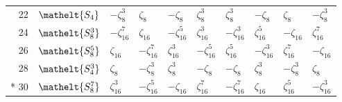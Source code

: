 \documentclass[10pt,a4paper]{article}
\numberwithin{equation}{section}
\newcommand{\eltfont}[1]{{\let\sigma\eltsigma\mathelt{#1}}}
\newcommand{\cls}[1]{\eltfont{#1}}
\newcommand{\rootunity}[1]{\zeta_{#1}}
\begin{document}
{\begin{longtable}{@{}rlllllllll@{}}
22 & $\cls{S_{4}}$ & $-\rootunity{8}^{3}$ & $\rootunity{8}$ & $-\rootunity{8}$ & $\rootunity{8}^{3}$ & $\rootunity{8}^{3}$ & $-\rootunity{8}$ & $\rootunity{8}$ & $-\rootunity{8}^{3}$\\
24 & $\cls{S_{8}^{3}}$ & $-\rootunity{16}^{7}$ & $\rootunity{16}$ & $-\rootunity{16}^{5}$ & $\rootunity{16}^{3}$ & $-\rootunity{16}^{3}$ & $\rootunity{16}^{5}$ & $-\rootunity{16}$ & $\rootunity{16}^{7}$\\
26 & $\cls{S_{8}^{5}}$ & $\rootunity{16}$ & $-\rootunity{16}^{7}$ & $\rootunity{16}^{3}$ & $-\rootunity{16}^{5}$ & $\rootunity{16}^{5}$ & $-\rootunity{16}^{3}$ & $\rootunity{16}^{7}$ & $-\rootunity{16}$\\
28 & $\cls{S_{4}^{3}}$ & $\rootunity{8}$ & $-\rootunity{8}^{3}$ & $\rootunity{8}^{3}$ & $-\rootunity{8}$ & $-\rootunity{8}$ & $\rootunity{8}^{3}$ & $-\rootunity{8}^{3}$ & $\rootunity{8}$\\*
30 & $\cls{S_{8}^{7}}$ & $\rootunity{16}^{3}$ & $-\rootunity{16}^{5}$ & $-\rootunity{16}$ & $\rootunity{16}^{7}$ & $-\rootunity{16}^{7}$ & $\rootunity{16}$ & $\rootunity{16}^{5}$ & $-\rootunity{16}^{3}$\\
\bottomrule\end{longtable}}
\end{document}

